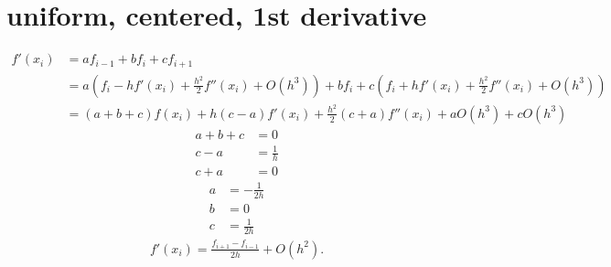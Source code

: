 \documentclass{article}
\begin{document}
\section{uniform, centered, 1st derivative}
\begin{align}
    f'\left( x_i \right) &= af_{i-1} + bf_{i} + cf_{i+1}
    \\
    &= a\left( f_{i} - hf'\left( x_i \right) + \frac{h^2}{2}f''\left( x_i \right) + O\left( h^3 \right)\right)
    + bf_{i}
    + c\left( f_{i} + hf'\left( x_i \right) + \frac{h^2}{2}f''\left( x_i \right) + O\left( h^3 \right)\right)
    \\
    &= \left( a + b + c \right)f\left( x_i \right)
    + h\left( c - a \right)f'\left( x_i \right)
    + \frac{h^2}{2}\left( c + a \right)f''\left( x_i \right)
    + aO\left( h^3 \right) + cO\left( h^3 \right)
    \label{}
\end{align}
\begin{align}
    a + b + c &= 0
    \\
    c - a &= \frac{1}{h}
    \\
    c + a &= 0
    \label{}
\end{align}
\begin{align}
    a &= -\frac{1}{2h}
    \\
    b &= 0
    \\
    c &= \frac{1}{2h}
    \label{}
\end{align}
\begin{align}
    f'\left( x_i \right) = \frac{f_{i+1} - f_{i-1}}{2h} + O\left( h^2 \right).
    \label{}
\end{align}
\end{document}

